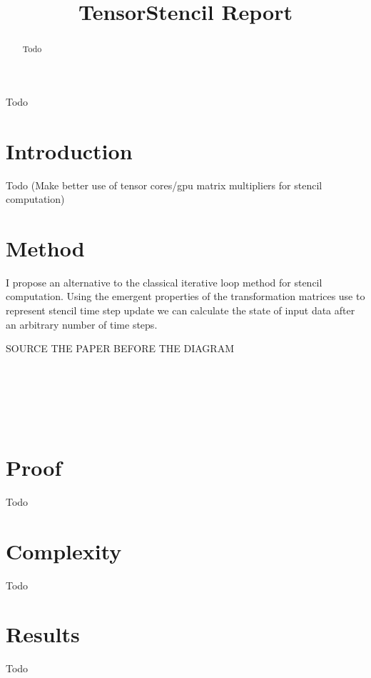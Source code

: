 \documentclass[conference]{IEEEtran}
\begin{document}

\title{TensorStencil Report}

\author{

}

\maketitle

\begin{abstract}
Todo
\end{abstract}

\begin{IEEEkeywords}
Todo
\end{IEEEkeywords}


\section{Introduction}
Todo (Make better use of tensor cores/gpu matrix multipliers for stencil computation)
\section{Method}
I propose an alternative to the classical iterative loop method for stencil computation. 
Using the emergent properties of the transformation matrices use to represent stencil time step update we can calculate the state of input data after an arbitrary number of time steps. 

SOURCE THE PAPER BEFORE THE DIAGRAM \\

 \\
 \\
 \\
 \\
 \\








\section{Proof}

Todo
\section{Complexity}
Todo
\section{Results}
Todo
\end{document}
